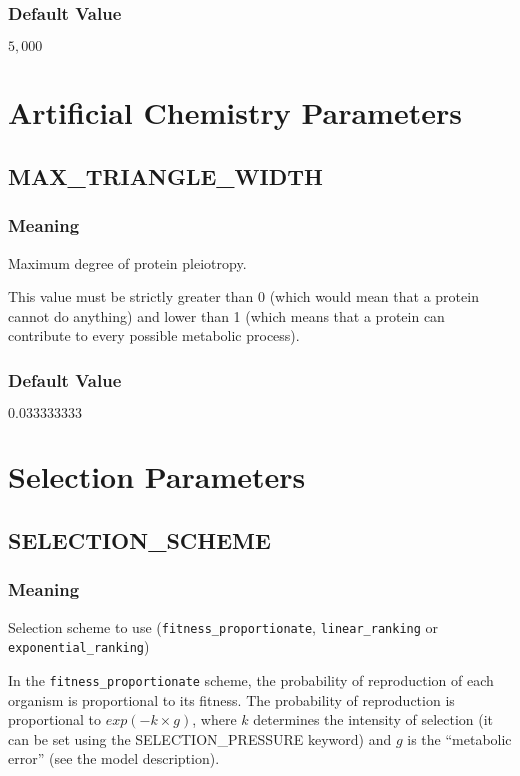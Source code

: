 \subsubsection{Default Value}
$5,000$



\section{Artificial Chemistry Parameters}

\subsection{MAX\_TRIANGLE\_WIDTH}
\subsubsection{Meaning}
Maximum degree of protein pleiotropy.

This value must be strictly greater than 0 (which would mean that a protein cannot do anything) and lower than 1 (which means that a protein can contribute to every possible metabolic process).
\subsubsection{Default Value}
$0.033333333$



\section{Selection Parameters}

\subsection{SELECTION\_SCHEME}
\subsubsection{Meaning}
Selection scheme to use (\verb?fitness_proportionate?, \verb?linear_ranking? or \verb?exponential_ranking?)

In the \verb?fitness_proportionate? scheme, the probability of reproduction of each organism is proportional to its fitness. The probability of reproduction is proportional to $exp(-k\times{}g)$, where $k$ determines the intensity of selection (it can be set using the SELECTION\_PRESSURE keyword) and $g$ is the ``metabolic error'' (see the model description).

